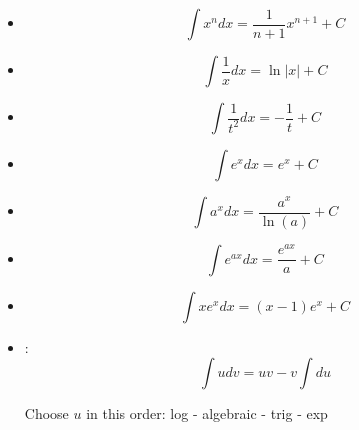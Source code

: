 \begin{multicols}{2}
    \begin{itemize}
      \item \[\int x^n dx = \frac{1}{n + 1} x^{n + 1} + C \]
      \item \[\int \frac{1}{x} dx = \ln|x| + C \]
      \item \[\int \frac{1}{t^2} dx = - \frac{1}{t} + C\]
      \item \[\int e^x dx = e^x + C\]
      \item \[\int a^x dx = \frac{a^x}{\ln(a)} + C\]
      \item \[\int e^{ax} dx = \frac{e^{ax}}{a} + C\]
      \item \[\int x e^x dx = (x - 1)e^x + C\]
      \item {}:
        \[
          \int udv = uv - v \int du
        \]
        \par Choose $u$ in this order: log - algebraic - trig - exp
    \end{itemize}
  \end{multicols}
    \clearpage
